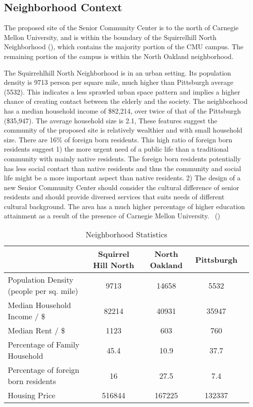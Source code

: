 \subsection{Neighborhood Context}
The proposed site of the Senior Community Center is to the north of
Carnegie Mellon University, and is within the boundary of the
Squirrelhill North Neighborhood (), which
contains the majority portion of the CMU campus. The remaining portion
of the campus is within the North Oakland neighborhood. 

The Squirrehlhill North Neighborhood is in an urban setting. Its
population density is 9713 person per square mile, much higher than
Pittsburgh average (5532). This indicates a less sprawled urban space
pattern and implies a higher chance of creating contact between the
elderly and the society. The neighborhood has a median household
income of \$82,214, over twice of that of the Pittsburgh
(\$35,947). The average household size is 2.1, These features suggest
the community of the proposed site is relatively wealthier and with
small household size. There are 16\% of foreign born residents. This
high ratio of foreign born residents suggest 1) the more urgent need
of a public life than a traditional community with mainly native
residents. The foreign born residents potentially has less social
contact than native residents and thus the community and social life
might be a more important aspect than native residents. 2) The design
of a new Senior Community Center should consider the cultural
difference of senior residents and should provide diversed services
that suits needs of different cultural background.  The area has a
much higher percentage of higher education attainment as a result of
the presence of Carnegie Mellon University.~\cite{neighborhood}
()
\begin{table}
\begin{tabular}{ p{2in}|c c c c}
\toprule
&Squirrel Hill North&North Oakland&Pittsburgh\\
\midrule
Population Density (people per sq. mile)&9713&14658&5532\\
Median Household Income / \$&82214&40931&35947\\
Median Rent / \$&1123&603&760\\
Percentage of Family Household&45.4&10.9&37.7\\
Percentage of foreign born residents&16&27.5&7.4\\
Housing Price&516844&167225&132337\\
\bottomrule
\end{tabular}
\caption{Neighborhood Statistics}
\label{tab:neighborStat}
\end{table}

